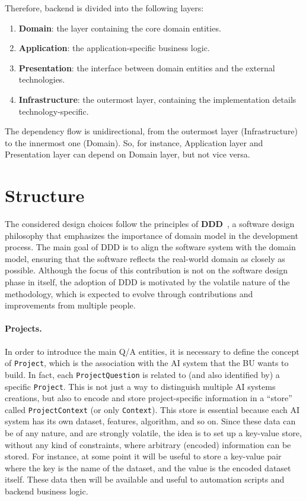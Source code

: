 \documentclass[12pt,a4paper,openright,twoside]{book}
\begin{document}
Therefore, backend is divided into the following layers:

\begin{enumerate}
    \item \textbf{Domain}: the layer containing the core domain entities.
    \item \textbf{Application}: the application-specific business logic.
    \item \textbf{Presentation}: the interface between domain entities and the external technologies.
    \item \textbf{Infrastructure}: the outermost layer, containing the implementation details technology-specific.
\end{enumerate}

% 
The dependency flow is unidirectional, from the outermost layer (Infrastructure) to the innermost one (Domain).
%
So, for instance, Application layer and Presentation layer can depend on Domain layer, but not vice versa.
%

\section{Structure}
%
The considered design choices follow the principles of \textbf{\ac{DDD}}~\cite{millett2015ddd}, a software design philosophy that emphasizes the importance of domain model in the development process.
%
The main goal of \ac{DDD} is to align the software system with the domain model, ensuring that the software reflects the real-world domain as closely as possible.
%
Although the focus of this contribution is not on the software design phase in itself, the adoption of \ac{DDD} is motivated by the volatile nature of the methodology, which is expected to evolve through contributions and improvements from multiple people.


\paragraph{Projects.}
In order to introduce the main \ac{Q/A} entities, it is necessary to define the concept of \texttt{Project}, which is the association with the \ac{AI} system that the \ac{BU} wants to build.
%
In fact, each \texttt{ProjectQuestion} is related to (and also identified by) a specific \texttt{Project}.
%
This is not just a way to distinguish multiple AI systems creations, but also to encode and store project-specific information in a ``store'' called \texttt{ProjectContext} (or only \texttt{Context}).
%
This store is essential because each \ac{AI} system has its own dataset, features, algorithm, and so on.
%
Since these data can be of any nature, and are strongly volatile, the idea is to set up a key-value store, without any kind of constraints, where arbitrary (encoded) information can be stored.
%
For instance, at some point it will be useful to store a key-value pair where the key is the name of the dataset, and the value is the encoded dataset itself.
%
These data then will be available and useful to automation scripts and backend business logic.
\end{document}
